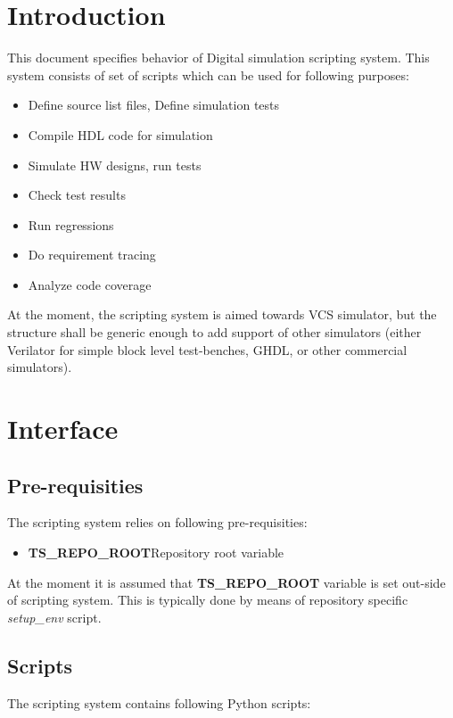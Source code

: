 \documentclass{tropic_design_spec}
\begin{document}
\section{Introduction}
This document specifies behavior of Digital simulation scripting system. This
system consists of set of scripts which can be used for following purposes:
\begin{itemize}
    \item{Define source list files, Define simulation tests}
    \item{Compile HDL code for simulation}
    \item{Simulate HW designs, run tests}
    \item{Check test results}
    \item{Run regressions}
    \item{Do requirement tracing}
    \item{Analyze code coverage}
\end{itemize}

At the moment, the scripting system is aimed towards VCS simulator, but the
structure shall be generic enough to add support of other simulators (either
Verilator for simple block level test-benches, GHDL, or other commercial simulators).


\pagebreak
\section{Interface}

\subsection{Pre-requisities}

The scripting system relies on following pre-requisities:

\begin{itemize}
	\item{\textbf{TS_REPO_ROOT}\space}{Repository root variable}
\end{itemize}

At the moment it is assumed that \textbf{TS_REPO_ROOT} variable is set out-side
of scripting system. This is typically done by means of repository specific
\textit{setup_env} script.

\subsection{Scripts}
The scripting system contains following Python scripts:
\end{document}
